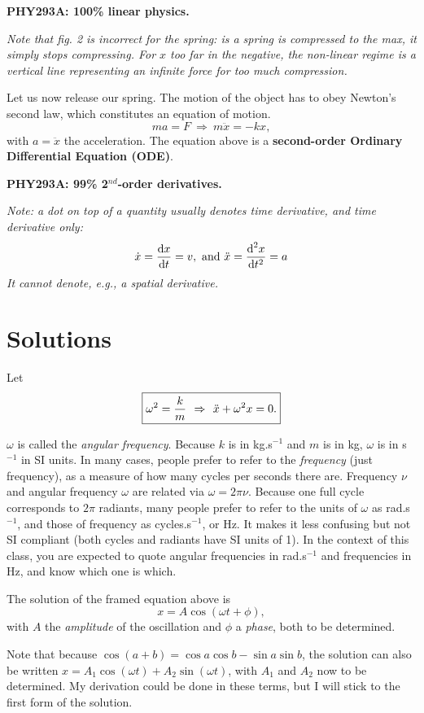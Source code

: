 \documentclass[11pt]{article}
\begin{document}
    \textbf{PHY293A: 100\% linear physics.}

\emph{Note that fig. 2 is incorrect for the spring: is a spring is
compressed to the max, it simply stops compressing. For \(x\) too far in
the negative, the non-linear regime is a vertical line representing an
infinite force for too much compression.}

    Let us now release our spring. The motion of the object has to obey
Newton's second law, which constitutes an equation of motion.
\[ ma = F\ \Rightarrow\ m\ddot{x} = -kx, \] with \(a = \ddot{x}\) the
acceleration. The equation above is a \textbf{second-order Ordinary
Differential Equation (ODE)}.

\textbf{PHY293A: 99\% 2}\(^{nd}\)\textbf{-order derivatives.}

\emph{Note: a dot on top of a quantity usually denotes time derivative,
and time derivative only:}
\[ \dot{x} = \frac{\textrm{d} {x}}{\textrm{d} {t}} = v, \ \textrm{and}\ \ddot x = \frac{\textrm{d}^{2} {x}}{\textrm{d} {t}^{2}} = a \]
\emph{It cannot denote, e.g., a spatial derivative.}

    \section{Solutions}\label{solutions}

Let
\[\boxed{ \large \omega^2 = \frac{k}{m} \ \Rightarrow \ \ddot{x} + \omega^2 x = 0.} \]

    \(\omega\) is called the \emph{angular frequency}. Because \(k\) is in
kg.s\(^{-1}\) and \(m\) is in kg, \(\omega\) is in s\(^{-1}\) in SI
units. In many cases, people prefer to refer to the \emph{frequency}
(just frequency), as a measure of how many cycles per seconds there are.
Frequency \(\nu\) and angular frequency \(\omega\) are related via
\(\omega = 2\pi \nu\). Because one full cycle corresponds to \(2\pi\)
radiants, many people prefer to refer to the units of \(\omega\) as
rad.s\(^{-1}\), and those of frequency as cycles.s\(^{-1}\), or Hz. It
makes it less confusing but not SI compliant (both cycles and radiants
have SI units of 1). In the context of this class, you are expected to
quote angular frequencies in rad.s\(^{-1}\) and frequencies in Hz, and
know which one is which.

    The solution of the framed equation above is
\[ x = A\cos(\omega t + \phi), \] with \(A\) the \emph{amplitude} of the
oscillation and \(\phi\) a \emph{phase}, both to be determined.

Note that because \(\cos(a+b) = \cos{a}\cos{b} - \sin{a}\sin{b}\), the
solution can also be written
\(x = A_1\cos(\omega t) + A_2\sin(\omega t)\), with \(A_1\) and \(A_2\)
now to be determined. My derivation could be done in these terms, but I
will stick to the first form of the solution.
\end{document}
